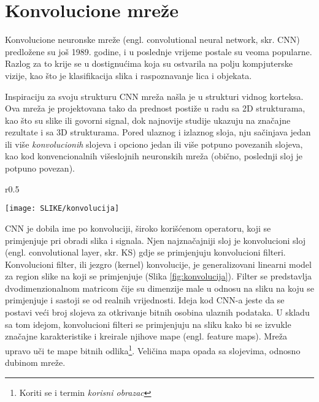\documentclass[12pt]{report}
\numberwithin{equation}{section}
\begin{document}
\newpage

\section{Konvolucione mreže}


Konvolucione neuronske mreže (engl. convolutional neural network, skr. CNN) predložene su još 1989. godine, i u poslednje vrijeme postale su veoma popularne. Razlog za to krije se u dostignućima koja su ostvarila na polju kompjuterske vizije, kao što je klasifikacija slika i raspoznavanje lica i objekata. 

  Inspiraciju za svoju strukturu CNN mreža našla je u strukturi vidnog korteksa. Ova mreža je projektovana tako da prednost postiže u radu sa 2D strukturama, kao što su slike ili govorni signal, dok najnovije  studije  ukazuju na značajne rezultate i sa 3D strukturama.  Pored ulaznog i izlaznog sloja, nju sačinjava jedan ili više \textit{konvolucionih} slojeva i opciono jedan ili više potpuno povezanih slojeva,  kao kod konvencionalnih višeslojnih neuronskih  mreža (obično, poslednji sloj je potpuno povezan).  

   \begin{wrapfigure}{r}{0.5\textwidth}
\vspace{-20pt}  
  \begin{center}
    \texttt{[image: SLIKE/konvolucija]}
  \end{center}
  \vspace{-20pt}
  \caption{Primjer konvolucije: Na monohromatsku sliku se primjenjuje filter, pri čemu je korak $K=1$.}
  \label{fig:konvolucija}
  \vspace{-20pt}
\end{wrapfigure}

CNN je dobila  ime  po  konvoluciji,  široko  korišćenom operatoru, koji  se  primjenjuje  pri  obradi  slika  i  signala. Njen najznačajniji sloj je konvolucioni sloj (engl. convolutional layer, skr. KS) gdje se primjenjuju konvolucioni  filteri.   Konvolucioni  filter, ili jezgro (kernel) konvolucije, je  generalizovani linearni  model za region slike na  koji se  primjenjuje (Slika \ref{fig:konvolucija}). Filter se predstavlja dvodimenzionalnom matricom čije su dimenzije male u odnosu na sliku na koju se primjenjuje i sastoji se od realnih vrijednosti. Ideja kod CNN-a jeste da  se postavi veći broj slojeva za otkrivanje bitnih  osobina ulaznih podataka.  U  skladu  sa  tom  idejom, konvolucioni  filteri se primjenjuju na sliku kako bi se izvukle značajne karakteristike i kreirale njihove mape  (engl. feature  maps). Mreža upravo uči te mape bitnih odlika\footnote{Koriti se i termin \textit{korisni obrazac}}. Veličina mapa opada sa slojevima, odnosno dubinom mreže. %
\end{document}
